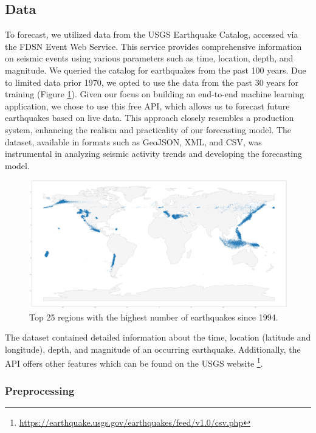 \subsection{Data}
To forecast, we utilized data from the \ac{USGS} Earthquake Catalog, accessed via
the \ac{FDSN} Event Web Service. This service provides comprehensive information
on seismic events using various parameters such as time, location, depth, and magnitude.
We queried the catalog for earthquakes from the past 100 years. Due to
limited data prior 1970, we opted to use the data from the past 30 years
for training (Figure \ref{fig:world-map}). Given our focus on building an end-to-end machine learning
application, we chose to use this free API, which allows us to forecast
future earthquakes based on live data. This approach closely resembles a
production system, enhancing the realism and practicality of our forecasting
model. The dataset, available in formats such as GeoJSON, XML, and CSV, was
instrumental in analyzing seismic activity trends and developing the forecasting model.


\begin{figure}[hbtp]
  \centering
  \includegraphics[scale=0.13]{img/world-earthquakes-top-25-regions-past-30-years.png}
  \captionsetup{format=hang}
  \caption{\label{fig:world-map}Top 25 regions with the highest number of earthquakes since 1994.}
\end{figure}

The dataset contained detailed information about the time, location (latitude and longitude),
depth, and magnitude of an occurring earthquake. Additionally, the API offers
other features which can be found on the
\ac{USGS} website \footnote{\url{https://earthquake.usgs.gov/earthquakes/feed/v1.0/csv.php}}.

\subsubsection{Preprocessing}

